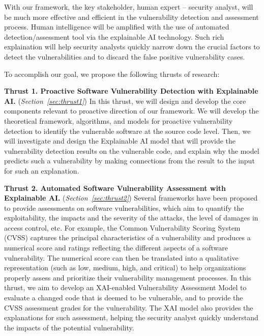 With our framework, the key stakeholder, human expert -- security
analyst, will be much more effective and efficient in the
vulnerability detection and assessment process. Human intelligence
will be amplified with the use of automated detection/assessment tool
via the explainable AI technology. Such rich explaination will help
security analysts quickly narrow down the crucial factors to detect
the vulnerabilities and to discard the false positive vulnerability
cases.

To accomplish our goal, we propose the following thrusts of research:


\noindent \textbf{Thrust 1. Proactive Software Vulnerability Detection
  with Explainable AI.} ({\em Section~\ref{sec:thrust1}}) In this
thrust, we will design and develop the core components relevant to
proactive direction of our framework. We will develop the
theoretical framework, algorithms, and models for proactive
vulnerability detection to identify the vulnerable software at the
source code level. Then, we will investigate and design the
Explainable AI model that will provide the vulnerability detection
results on the vulnerable code, and explain why the model
predicts such a vulnerability by making connections from the result to
the input for such an explanation.

\noindent \textbf{Thrust 2. Automated Software Vulnerability
  Assessment with Explainable AI.} ({\em Section~\ref{sec:thrust2}})
Several frameworks have been proposed to provide assessments on
software vulnerabilities, which aim to quantify the exploitability,
the impacts and the severity of the attacks, the level of damages in
access control, etc. For example, the Common Vulnerability Scoring
System (CVSS) captures the principal characteristics of a
vulnerability and produces a numerical score and ratings reflecting
the different aspects of a software vulnerability. The numerical score
can then be translated into a qualitative representation (such as low,
medium, high, and critical) to help organizations properly assess and
prioritize their vulnerability management processes. In this thrust,
we aim to develop an XAI-enabled Vulnerability Assessment Model to
evaluate a changed code that is deemed to be vulnerable, and to
provide the CVSS assessment grades for the vulnerability. The XAI
model also provides the explanations for such assessment, helping the
security analyst quickly understand the impacts of the potential
vulnerability.


